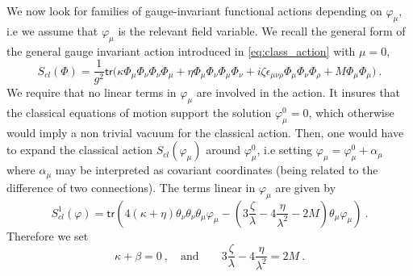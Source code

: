 \documentclass[11pt]{book}
\newcommand{\tr}{\mathsf{tr}}
\theoremstyle{break}
\begin{document}
We now look for families of gauge-invariant functional actions depending on $\varphi_\mu$, i.e we assume that $\varphi_\mu$ is the relevant field variable. We recall the general form of the general gauge invariant action introduced in \eqref{eq:class_action} with $\mu=0$,
%
\begin{equation}
S_{cl}(\Phi) = \frac{1}{g^2} \tr\bigg( \kappa \Phi_\mu \Phi_\nu \Phi_\nu \Phi_\mu + \eta \Phi_\mu \Phi_\nu \Phi_\mu \Phi_\nu + i \zeta \epsilon_{\mu\nu\rho} \Phi_\mu \Phi_\nu \Phi_\rho + M \Phi_\mu \Phi_\mu \bigg) \ . 
\label{class_action_adroit}
\end{equation}
%
We require that no linear terms in $\varphi_\mu$ are involved in the action. It insures that the classical equations of motion support the solution $\varphi^0_\mu=0$, which otherwise would imply a non trivial vacuum for the classical action. Then, one would have to expand the classical action $S_{cl}(\varphi_\mu)$ around $\varphi^0_\mu$, i.e setting $\varphi_\mu = \varphi^0_\mu + \alpha_\mu$ where $\alpha_\mu$ may be interpreted as covariant coordinates (being related to the difference of two connections). The terms linear in $\varphi_\mu$ are given by
%
\begin{equation*}
S^1_{cl}(\varphi) = \tr\left( 4(\kappa+\eta) \theta_\nu \theta_\nu \theta_\mu \varphi_\mu - \left(3\frac{\zeta}{\lambda} - 4\frac{\eta}{\lambda^2}-2M\right) \theta_\mu \varphi_\mu \right) \ .
\end{equation*}
%
Therefore we set
%
\begin{equation*}
\kappa + \beta = 0 \ , \quad \mbox{and} \qquad 3 \frac{\zeta}{\lambda}-4\frac{\eta}{\lambda^2} = 2M \ .
\end{equation*}
\end{document}
